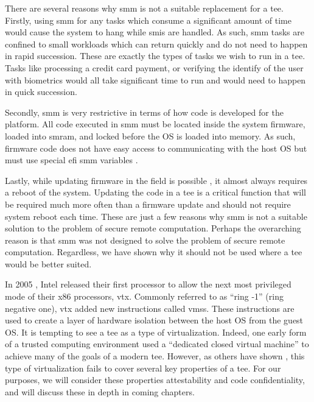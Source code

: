 There are several reasons why \gls{smm} is not a suitable replacement for a \gls{tee}. Firstly, using \gls{smm} for any tasks which consume a significant amount of time would cause the system to hang while \glspl{smi} are handled. As such, \gls{smm} tasks are confined to small workloads which can return quickly and do not need to happen in rapid succession. These are exactly the types of tasks we wish to run in a \gls{tee}. Tasks like processing a credit card payment, or verifying the identify of the user with biometrics would all take significant time to run and would need to happen in quick succession.

Secondly, \gls{smm} is very restrictive in terms of how code is developed for the platform. All code executed in \gls{smm} must be located inside the system firmware, loaded into \gls{smram}, and locked before the OS is loaded into memory. As such, firmware code does not have easy access to communicating with the host OS but must use special \gls{efi} \gls{smm} variables \cite{uefi2020}.

Lastly, while updating firmware in the field is possible \cite{zimmer2011apparatus}, it almost always requires a reboot of the system. Updating the code in a \gls{tee} is a critical function that will be required much more often than a firmware update and should not require system reboot each time. These are just a few reasons why \gls{smm} is not a suitable solution to the problem of secure remote computation. Perhaps the overarching reason is that \gls{smm} was not designed to solve the problem of secure remote computation. Regardless, we have shown why it should not be used where a \gls{tee} would be better suited.

In 2005 \cite{uhlig2005intel}, Intel released their first processor to allow the next most privileged mode of their x86 processors, \gls{vtx}. Commonly referred to as ``ring -1'' (ring negative one), \gls{vtx} added new instructions called \glspl{vms}. These instructions are used to create a layer of hardware isolation between the host OS from the guest OS. It is tempting to see a \gls{tee} as a type of virtualization. Indeed, one early form of a trusted computing environment used a ``dedicated closed virtual machine'' \cite{garfinkel2003terra} to achieve many of the goals of a modern \gls{tee}. However, as others have shown \cite{teeWhatIsIt}, this type of virtualization fails to cover several key properties of a \gls{tee}. For our purposes, we will consider these properties attestability and code confidentiality, and will discuss these in depth in coming chapters.

